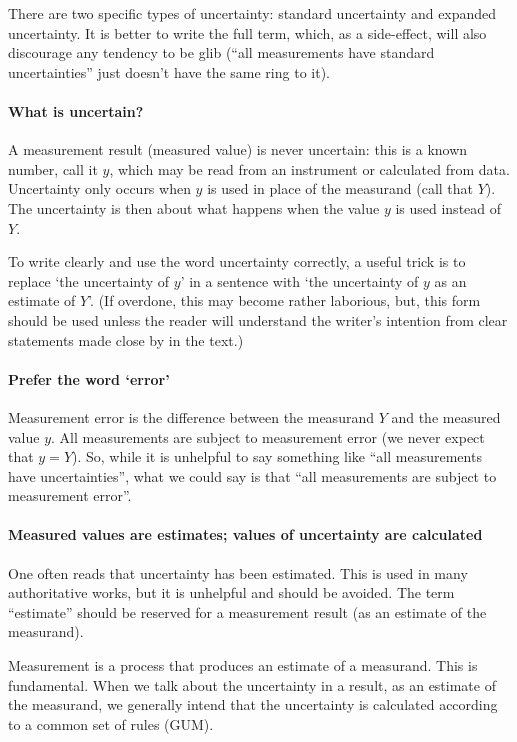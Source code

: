 There are two specific types of uncertainty: standard uncertainty and expanded uncertainty. It is better to write the full term, which, as a side-effect, will also discourage any tendency to be glib (``all measurements have standard uncertainties'' just doesn't have the same ring to it). 

\paragraph{What is uncertain?}
A measurement result (measured value) is never uncertain: this is a known number, call it $y$, which may be read from an instrument or calculated from data. Uncertainty only occurs when $y$ is used in place of the measurand (call that $Y$). The uncertainty is then about what happens when the value $y$ is used instead of $Y$. 

To write clearly and use the word uncertainty correctly, a useful trick is to replace `the uncertainty of $y$' in a sentence with `the uncertainty of $y$ as an estimate of $Y$'. (If overdone, this may become rather laborious, but, this form should be used unless the reader will understand the writer's intention from clear statements made close by in the text.) 

\paragraph{Prefer the word `error'} 
Measurement error is the difference between the measurand $Y$ and the measured value $y$. All measurements are subject to measurement error (we never expect that $y=Y$). So, while it is unhelpful to say something like ``all measurements have uncertainties'', what we could say is that ``all measurements are subject to measurement error''.

\paragraph{Measured values are estimates; values of uncertainty are calculated}

One often reads that uncertainty has been estimated. This is used in many authoritative works, but it is unhelpful and should be avoided. The term ``estimate'' should be reserved for a measurement result (as an estimate of the measurand). 

Measurement is a process that produces an estimate of a measurand. This is fundamental. When we talk about the uncertainty in a result, as an estimate of the measurand, we generally intend that the uncertainty is calculated according to a common set of rules (GUM). 

